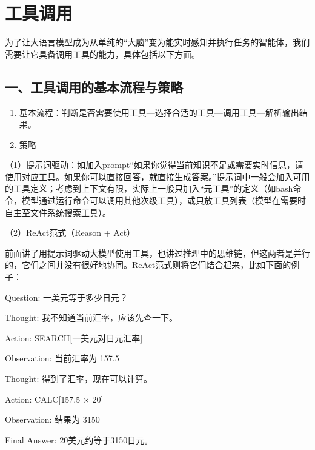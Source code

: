 \setcounter{section}{0}

\hypertarget{ux5de5ux5177ux8c03ux7528-1}{%
\section{工具调用}\label{ux5de5ux5177ux8c03ux7528-1}}

为了让大语言模型成为从单纯的``大脑''变为能实时感知并执行任务的智能体，我们需要让它具备调用工具的能力，具体包括以下方面。

\hypertarget{ux4e00ux5de5ux5177ux8c03ux7528ux7684ux57faux672cux6d41ux7a0bux4e0eux7b56ux7565}{%
\subsection{一、工具调用的基本流程与策略}\label{ux4e00ux5de5ux5177ux8c03ux7528ux7684ux57faux672cux6d41ux7a0bux4e0eux7b56ux7565}}

\begin{enumerate}
\def\labelenumi{\arabic{enumi}.}
\item
  基本流程：判断是否需要使用工具---选择合适的工具---调用工具---解析输出结果。
\item
  策略
\end{enumerate}

（1）提示词驱动：如加入prompt``如果你觉得当前知识不足或需要实时信息，请使用对应工具。如果你可以直接回答，就直接生成答案。''提示词中一般会加入可用的工具定义；考虑到上下文有限，实际上一般只加入``元工具''的定义（如bash命令，模型通过运行命令可以调用其他次级工具），或只放工具列表（模型在需要时自主至文件系统搜索工具）。

（2）ReAct范式（Reason + Act）

前面讲了用提示词驱动大模型使用工具，也讲过推理中的思维链，但这两者是并行的，它们之间并没有很好地协同。ReAct范式则将它们结合起来，比如下面的例子：

Question: 一美元等于多少日元？

Thought: 我不知道当前汇率，应该先查一下。

Action: SEARCH{[}一美元对日元汇率{]}

Observation: 当前汇率为 157.5

Thought: 得到了汇率，现在可以计算。

Action: CALC{[}157.5 × 20{]}

Observation: 结果为 3150

Final Answer: 20美元约等于3150日元。

